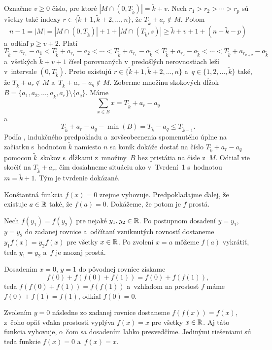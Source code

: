 {\smallskip
Označme $v\ge0$ číslo, pre ktoré $|M\cap(0,T_{\tilde k})|=\tilde k+v$. Nech $r_1>r_2>\cdots>r_p$ sú všetky také indexy $r\in\{\tilde k+1,\tilde k+2,\dots,n\}$, že $T_{\tilde k}+a_r\notin M$. Potom
$$
  n-1=|M|=|M\cap(0,T_{\tilde k})|+1+|M\cap(T_{\tilde k},s)|\ge\tilde k+v+1+(n-\tilde k-p)
$$
a~odtiaľ $p\ge v+2$. Platí
$$
T_{\tilde k}+a_{r_1}-a_1<T_{\tilde k}+a_{r_1}-a_2<\cdots<T_{\tilde k}+a_{r_1}-a_{\tilde k}%
<T_{\tilde k}+a_{r_2}-a_{\tilde k}<\cdots<T_{\tilde k}+a_{r_{v+2}}-a_{\tilde k}%
$$
a~všetkých $\tilde k+v+1$ čísel porovnaných v~predošlých nerovnostiach leží v~intervale $(0,T_{\tilde k})$. Preto existujú $r\in\{\tilde k+1,\tilde k+2,\dots,n\}$ a~$q\in\{1,2,\dots,\tilde k\}$ také, že $T_{\tilde k}+a_r\notin M$ a~$T_{\tilde k}+a_r-a_q\notin M$. Zoberme množinu skokových dĺžok $B=\{a_1,a_2,\dots,a_{\tilde k},a_r\}\setminus\{a_q\}$. Máme
$$
\sum_{x\in B}x=T_{\tilde k}+a_r-a_q
$$
a
$$
T_{\tilde k}+a_r-a_q-\min(B)=T_{\tilde k}-a_q\le T_{\tilde k-1}.
$$
Podľa , indukčného predpokladu a~zovšeobecnenia spomenutého úplne na začiatku s~hodnotou $\tilde k$ namiesto $n$ sa koník dokáže dostať na číslo $T_{\tilde k}+a_r-a_q$ pomocou $\tilde k$~skokov s~dĺžkami z~množiny~$B$ bez pristátia na čísle z~$M$. Odtiaľ vie skočiť na $T_{\tilde k}+a_r$, čím dosiahneme situáciu ako v~Tvrdení~1 s~hodnotou $m=\tilde k+1$. Tým je tvrdenie dokázané.
}

{%
Konštantná funkcia $f(x)=0$ zrejme vyhovuje. Predpokladajme ďalej, že existuje $a\in\Bbb R$ také, že $f(a)=0$. Dokážeme, že potom je $f$ prostá.

Nech $f(y_1)=f(y_2)$ pre nejaké $y_1,y_2\in\Bbb R$. Po postupnom dosadení $y=y_1$, $y=y_2$ do zadanej rovnice a~odčítaní vzniknutých rovností dostaneme $y_1f(x)=y_2f(x)$ pre všetky $x\in\Bbb R$. Po zvolení $x=a$ môžeme $f(a)$ vykrátiť, teda $y_1=y_2$ a~$f$ je naozaj prostá.

Dosadením $x=0$, $y=1$ do pôvodnej rovnice získame
$$
f(0)+f(f(0)+f(1))=f(0)+f(f(1)),
$$
teda $f(f(0)+f(1))=f(f(1))$ a~vzhľadom na prostosť $f$ máme $f(0)+f(1)=f(1)$, odkiaľ $f(0)=0$.

Zvolením $y=0$ následne zo zadanej rovnice dostaneme $f(f(x))=f(x)$, z~čoho opäť vďaka prostosti vyplýva $f(x)=x$ pre všetky $x\in\Bbb R$. Aj táto funkcia vyhovuje, o~čom sa dosadením ľahko presvedčíme. Jedinými riešeniami sú teda funkcie $f(x)=0$ a~$f(x)=x$.
}

